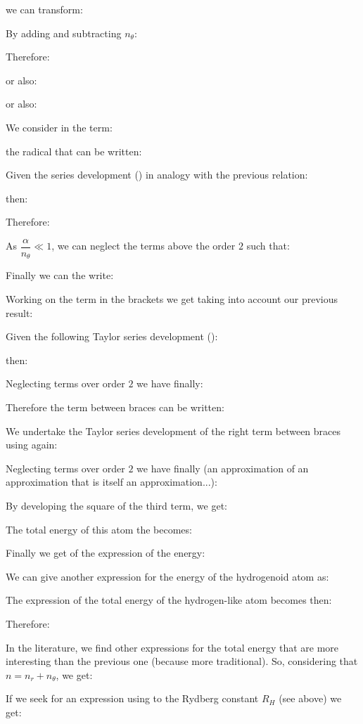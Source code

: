 	we can transform:
	
	By adding and subtracting $n_\theta$:
	
	Therefore:
	
	or also:
	
	or also:
	
	We consider in the term:
	
	the radical that can be written:
	
	Given the series development () in analogy with the previous relation:
	
	then:
	
	Therefore:
	
	As $\dfrac{\alpha}{n_\theta} \ll 1$, we can neglect the terms above the order $2$ such that:
	
	Finally we can the write:
	
	Working on the term in the brackets we get taking into account our previous result:
	
	Given the following Taylor series development ():
	
	then:
	
	Neglecting terms over order $2$ we have finally:
	
	Therefore the term between braces can be written:
	
	We undertake the Taylor  series development of the right term between braces using again:
	
	Neglecting terms over order $2$ we have finally (an approximation of an approximation that is itself an approximation...):
	
	By developing the square of the third term, we get:
	
	
	The total energy of this atom the becomes:
	
	Finally we get of the expression of the energy:
	
	We can give another expression for the energy of the hydrogenoid atom as:
	
	The expression of the total energy of the hydrogen-like atom becomes then:
	
	Therefore:
	
	In the literature, we find other expressions for the total energy that are more interesting than the previous one (because more traditional). So, considering that $n=n_r+n_\theta$, we get:
	
	If we seek for an expression using to the Rydberg constant $R_H$ (see above) we get:
	
